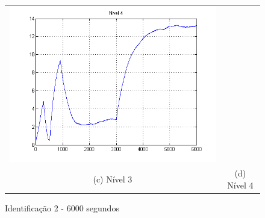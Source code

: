 \begin{figure}[H]
\begin{tabular}{cc}
		\includegraphics[height=0.15\paperheight,keepaspectratio]{img/sim2_h4.png} \\
		(c) Nível 3 &
		(d) Nível 4
	\end{tabular}
	\caption{\label{imgID_6000_v1} Identificação 2 - 6000 segundos}
\end{figure}

